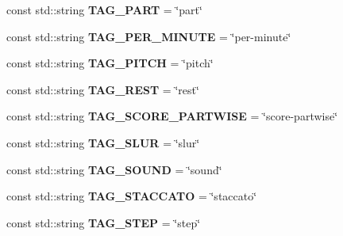 \begin{DoxyCompactItemize}
\item 
\hypertarget{namespacesinsy_a26eeed495eb80f91119c579bb40e7ee2}{const std\-::string {\bfseries \-T\-A\-G\-\_\-\-P\-A\-R\-T} = \char`\"{}part\char`\"{}}\label{namespacesinsy_a26eeed495eb80f91119c579bb40e7ee2}

\item 
\hypertarget{namespacesinsy_a484d40e4dcf12bba80951b8439a4e0db}{const std\-::string {\bfseries \-T\-A\-G\-\_\-\-P\-E\-R\-\_\-\-M\-I\-N\-U\-T\-E} = \char`\"{}per-\/minute\char`\"{}}\label{namespacesinsy_a484d40e4dcf12bba80951b8439a4e0db}

\item 
\hypertarget{namespacesinsy_a98d36ecf367111d8ae4850a1f7da75d9}{const std\-::string {\bfseries \-T\-A\-G\-\_\-\-P\-I\-T\-C\-H} = \char`\"{}pitch\char`\"{}}\label{namespacesinsy_a98d36ecf367111d8ae4850a1f7da75d9}

\item 
\hypertarget{namespacesinsy_aad761cec67971bcac83fdb4e8cc2087a}{const std\-::string {\bfseries \-T\-A\-G\-\_\-\-R\-E\-S\-T} = \char`\"{}rest\char`\"{}}\label{namespacesinsy_aad761cec67971bcac83fdb4e8cc2087a}

\item 
\hypertarget{namespacesinsy_a1a177c0324686f957bcf8c13ca4da86d}{const std\-::string {\bfseries \-T\-A\-G\-\_\-\-S\-C\-O\-R\-E\-\_\-\-P\-A\-R\-T\-W\-I\-S\-E} = \char`\"{}score-\/partwise\char`\"{}}\label{namespacesinsy_a1a177c0324686f957bcf8c13ca4da86d}

\item 
\hypertarget{namespacesinsy_ab61c75209d2a09b251f3608d08ee1a86}{const std\-::string {\bfseries \-T\-A\-G\-\_\-\-S\-L\-U\-R} = \char`\"{}slur\char`\"{}}\label{namespacesinsy_ab61c75209d2a09b251f3608d08ee1a86}

\item 
\hypertarget{namespacesinsy_a78246307136ac1cba9b531fd604bbbbf}{const std\-::string {\bfseries \-T\-A\-G\-\_\-\-S\-O\-U\-N\-D} = \char`\"{}sound\char`\"{}}\label{namespacesinsy_a78246307136ac1cba9b531fd604bbbbf}

\item 
\hypertarget{namespacesinsy_a2d1347ba30308f28e87073b48afbd15d}{const std\-::string {\bfseries \-T\-A\-G\-\_\-\-S\-T\-A\-C\-C\-A\-T\-O} = \char`\"{}staccato\char`\"{}}\label{namespacesinsy_a2d1347ba30308f28e87073b48afbd15d}

\item 
\hypertarget{namespacesinsy_a93d864fd34104a7ed693bff51f3db477}{const std\-::string {\bfseries \-T\-A\-G\-\_\-\-S\-T\-E\-P} = \char`\"{}step\char`\"{}}\label{namespacesinsy_a93d864fd34104a7ed693bff51f3db477}


\end{DoxyCompactItemize}
